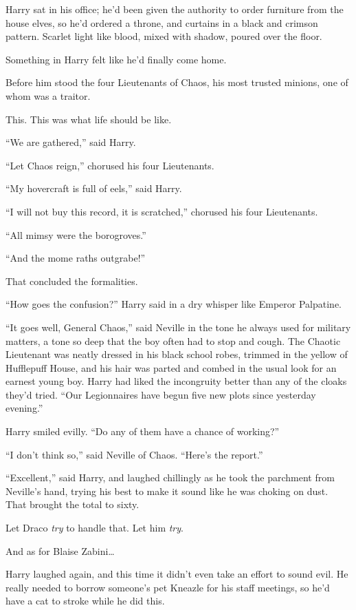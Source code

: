 Harry sat in his office; he’d been given the authority to order furniture from the house elves, so he’d ordered a throne, and curtains in a black and crimson pattern. Scarlet light like blood, mixed with shadow, poured over the floor.

Something in Harry felt like he’d finally come home.

Before him stood the four Lieutenants of Chaos, his most trusted minions, one of whom was a traitor.

This. This was what life should be like.

“We are gathered,” said Harry.

“Let Chaos reign,” chorused his four Lieutenants.

“My hovercraft is full of eels,” said Harry.

“I will not buy this record, it is scratched,” chorused his four Lieutenants.

“All mimsy were the borogroves.”

“And the mome raths outgrabe!”

That concluded the formalities.

“How goes the confusion?” Harry said in a dry whisper like Emperor Palpatine.

“It goes well, General Chaos,” said Neville in the tone he always used for military matters, a tone so deep that the boy often had to stop and cough. The Chaotic Lieutenant was neatly dressed in his black school robes, trimmed in the yellow of Hufflepuff House, and his hair was parted and combed in the usual look for an earnest young boy. Harry had liked the incongruity better than any of the cloaks they’d tried. “Our Legionnaires have begun five new plots since yesterday evening.”

Harry smiled evilly. “Do any of them have a chance of working?”

“I don’t think so,” said Neville of Chaos. “Here’s the report.”

“Excellent,” said Harry, and laughed chillingly as he took the parchment from Neville’s hand, trying his best to make it sound like he was choking on dust. That brought the total to sixty.

Let Draco \emph{try} to handle that. Let him \emph{try}.

And as for Blaise Zabini…

Harry laughed again, and this time it didn’t even take an effort to sound evil. He really needed to borrow someone’s pet Kneazle for his staff meetings, so he’d have a cat to stroke while he did this.

